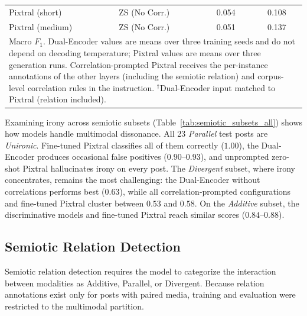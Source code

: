 \begin{table}[!t]
\begin{tabular}{l l c c}
Pixtral (short) & ZS (No Corr.) & 0.054 & 0.108 \\
Pixtral (medium) & ZS (No Corr.) & 0.051 & 0.137 \\
\hline
\multicolumn{4}{p{0.95\columnwidth}}{\footnotesize Macro $F_1$. Dual-Encoder values are means over three training seeds and do not depend on decoding temperature; Pixtral values are means over three generation runs. Correlation-prompted Pixtral receives the per-instance annotations of the other layers (including the semiotic relation) and corpus-level correlation rules in the instruction. $^{\dagger}$Dual-Encoder input matched to Pixtral (relation included).} \\
\end{tabular}
\end{table}

Examining irony across semiotic subsets (Table~\ref{tab:semiotic_subsets_all}) shows how models handle multimodal dissonance. All 23 \textit{Parallel} test posts are \textit{Unironic}. Fine-tuned Pixtral classifies all of them correctly ($1.00$), the Dual-Encoder produces occasional false positives ($0.90$--$0.93$), and unprompted zero-shot Pixtral hallucinates irony on every post. The \textit{Divergent} subset, where irony concentrates, remains the most challenging: the Dual-Encoder without correlations performs best ($0.63$), while all correlation-prompted configurations and fine-tuned Pixtral cluster between $0.53$ and $0.58$. On the \textit{Additive} subset, the discriminative models and fine-tuned Pixtral reach similar scores ($0.84$--$0.88$).

\FloatBarrier
\subsection{Semiotic Relation Detection}
\label{sec:relation_results}

Semiotic relation detection requires the model to categorize the interaction between modalities as Additive, Parallel, or Divergent. Because relation annotations exist only for posts with paired media, training and evaluation were restricted to the multimodal partition.


